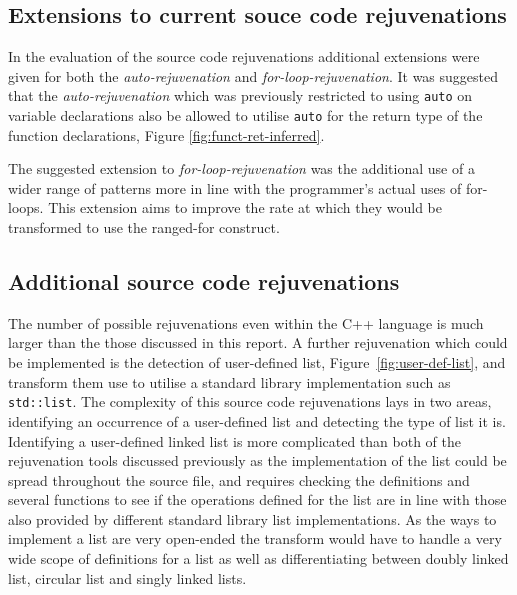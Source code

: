 \documentclass[bsc,frontabs,singlespacing,twoside,parskip,deptreport]{infthesis}
\begin{document}
\subsection{Extensions to current souce code rejuvenations}
In the evaluation of the source code rejuvenations additional extensions were given for both the \textit{auto-rejuvenation} and  \textit{for-loop-rejuvenation}. It was suggested that the \textit{auto-rejuvenation} which was previously restricted to using \texttt{auto} on variable declarations also be allowed to utilise \texttt{auto} for the return type of the function declarations, Figure \ref{fig:funct-ret-inferred}.

The suggested extension to \textit{for-loop-rejuvenation} was the additional use of a wider range of patterns more in line with the programmer's actual uses of for-loops. This extension aims to improve the rate at which they would be transformed to use the ranged-for construct.



\subsection{Additional source code rejuvenations}
The number of possible rejuvenations even within the C++ language is much larger than the those discussed in this report. A further rejuvenation which could be implemented is the detection of user-defined list, Figure~\ref{fig:user-def-list}, and transform them use to utilise a standard library implementation such as \texttt{std::list}. The complexity of this source code rejuvenations lays in two areas, identifying an occurrence of a user-defined list and detecting the type of list it is. Identifying a user-defined linked list is more complicated than both of the rejuvenation tools discussed previously as the implementation of the list could be spread throughout the source file, and requires checking the definitions and several functions to see if the operations defined for the list are in line with those also provided by different standard library list implementations. As the ways to implement a list are very open-ended the transform would have to handle a very wide scope of definitions for a list as well as differentiating between doubly linked list, circular list and singly linked lists.
\end{document}
